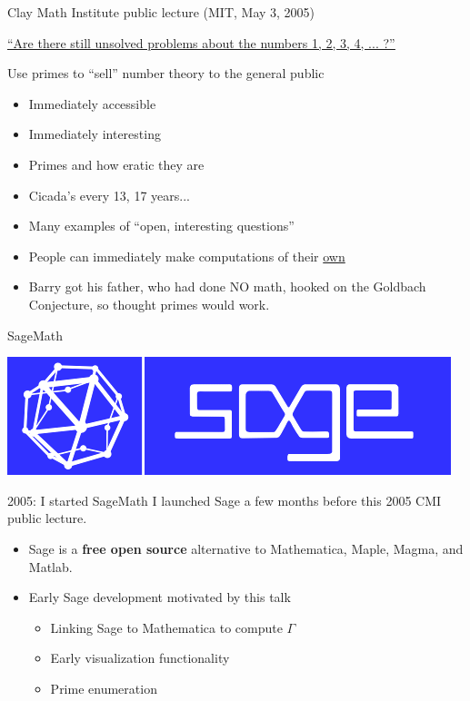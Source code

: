 \documentclass{beamer}
\begin{document}
\begin{frame}{Clay Math Institute public lecture (MIT, May 3, 2005)}
  \begin{center}
    \href{http://www.claymath.org/library/public\_lectures/mazur\_riemann\_hypothesis.pdf}{\small\underline{``Are there still unsolved problems about the numbers 1, 2, 3, 4, ... ?''}}
  \end{center}

  \vfill

  \begin{block}{Use primes to ``sell'' number theory to the general public}
    \begin{itemize}
      \item   Immediately accessible
      \item   Immediately interesting
      \item   Primes and how eratic they are
      \item   Cicada's every 13, 17 years...
      \item   Many examples of ``open, interesting questions''
      \item   People can immediately make computations of their \underline{own}
      \item   Barry got his father, who had done NO
            math, hooked on the Goldbach Conjecture, so thought
            primes would work.
    \end{itemize}
  \end{block}
\end{frame}

\begin{frame}{SageMath}
  \vfill
  \begin{center}
    \includegraphics[width=.7\textwidth]{pics/sage-logo}
  \end{center}
  \vfill

  \begin{block}{2005: I started SageMath}
    I launched Sage a few months before this 2005 CMI public lecture.
    \begin{itemize}
      \item Sage is a {\bf free open source} alternative to Mathematica, Maple, Magma, and Matlab.
      \item Early Sage development motivated by this talk
            \begin{itemize}
              \item Linking Sage to Mathematica to compute $\Gamma$
              \item Early visualization functionality
              \item Prime enumeration
            \end{itemize}
    \end{itemize}
  \end{block}
\end{frame}
\end{document}
